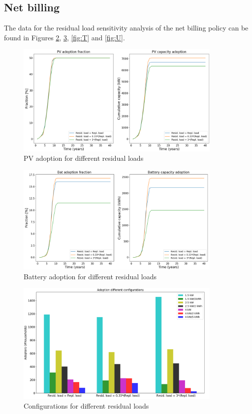 \subsection{Net billing}
The data for the residual load sensitivity analysis of the net billing policy can be found in Figures \ref{fig:R}, \ref{fig:S}, \ref{fig:T} and \ref{fig:U}. 
\newline 
\begin{figure}[h!]
    \centering
    \includegraphics[width=10cm]{AppendixA/PVNBresid.PNG}
    \caption{PV adoption for different residual loads}
    \label{fig:Q}
\end{figure}
\noindent
\newline 
\begin{figure}[h!]
    \centering
    \includegraphics[width=10cm]{AppendixA/BatNBresid.PNG}
    \caption{Battery adoption for different residual loads}
    \label{fig:R}
\end{figure}
\noindent
\newline 
\begin{figure}[h!]
    \centering
    \includegraphics[width=10cm]{AppendixA/ConfigNBresid.PNG}
    \caption{Configurations for different residual loads}
    \label{fig:S}
\end{figure}

